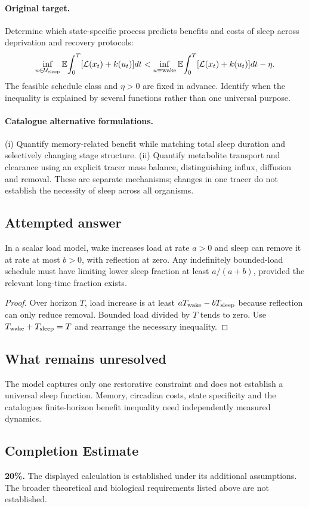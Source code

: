 \documentclass[11pt]{article}
\begin{document}
\paragraph{Original target.}
Determine which state-specific process predicts benefits and costs of sleep across deprivation and recovery protocols:
\[
\inf_{u\in\mathcal U_{\rm sleep}}\mathbb{E}\!\int_0^T[\mathcal L(x_t)+k(u_t)]dt
<\inf_{u\equiv\text{wake}}\mathbb{E}\!\int_0^T[\mathcal L(x_t)+k(u_t)]dt-\eta.
\]
The feasible schedule class and $\eta>0$ are fixed in advance. Identify when the inequality is explained by several functions rather than one universal purpose.
\paragraph{Catalogue alternative formulations.}
(i) Quantify memory-related benefit while matching total sleep duration and selectively changing stage structure. (ii) Quantify metabolite transport and clearance using an explicit tracer mass balance, distinguishing influx, diffusion and removal. These are separate mechanisms; changes in one tracer do not establish the necessity of sleep across all organisms.
\subsection{Attempted answer}
\begin{proposition}
In a scalar load model, wake increases load at rate $a>0$ and sleep can remove it at rate at most $b>0$, with reflection at zero. Any indefinitely bounded-load schedule must have limiting lower sleep fraction at least $a/(a+b)$, provided the relevant long-time fraction exists.
\end{proposition}
\begin{proof}
Over horizon $T$, load increase is at least $aT_{\rm wake}-bT_{\rm sleep}$ because reflection can only reduce removal. Bounded load divided by $T$ tends to zero. Use $T_{\rm wake}+T_{\rm sleep}=T$ and rearrange the necessary inequality.
\end{proof}
\subsection{What remains unresolved}
The model captures only one restorative constraint and does not establish a universal sleep function. Memory, circadian costs, state specificity and the catalogue\textquotesingle s finite-horizon benefit inequality need independently measured dynamics.
\subsection{Completion Estimate}
\textbf{20\%.} The displayed calculation is established under its additional assumptions. The broader theoretical and biological requirements listed above are not established.
\end{document}
